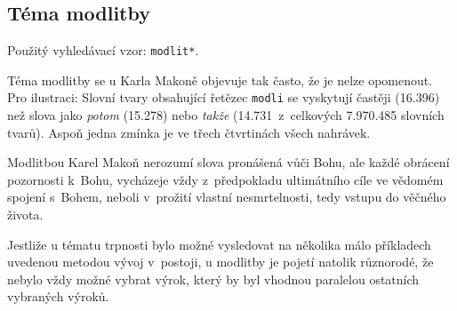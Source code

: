 \subsection{Téma modlitby}

Použitý vyhledávací vzor: \texttt{modlit*}.

Téma modlitby se u Karla Makoně objevuje tak často, že je nelze opomenout. Pro
ilustraci: Slovní tvary obsahující řetězec \texttt{modli} se vyskytují častěji
(16.396\texttimes) než slova jako \textit{potom} (15.278\texttimes) nebo
  \textit{takže} (14.731\texttimes~z~celkových 7.970.485 slovních tvarů). Aspoň
jedna zmínka je ve třech čtvrtinách všech nahrávek.


Modlitbou Karel Makoň nerozumí slova pronášená vůči Bohu, ale každé obrácení
pozornosti k~Bohu, vycházeje vždy z~předpokladu ultimátního cíle ve vědomém
spojení s~Bohem, neboli v~prožití vlastní nesmrtelnosti, tedy vstupu do věčného
života.

Jestliže u tématu trpnosti bylo možné vysledovat na několika málo příkladech
uvedenou metodou vývoj v~postoji, u modlitby je pojetí natolik různorodé, že
nebylo vždy možné vybrat výrok, který by byl vhodnou paralelou ostatních
vybraných výroků.

